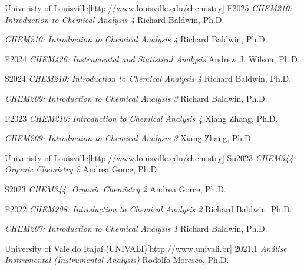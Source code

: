 \documentclass[10pt, twoside, table]{article} %
\begin{document}
\begin{timeline}{Univeristy of Louisville}[http://www.louisville.edu/chemistry]
    \entry
        {F2025}
        {\textit{CHEM210: Introduction to Chemical Analysis 4}}
        {Richard Baldwin, Ph.D.}

    \entry
        {}
        {\textit{CHEM210: Introduction to Chemical Analysis 4}}
        {Richard Baldwin, Ph.D.}

    \entry
        {F2024}
        {\textit{CHEM426: Instrumental and Statistical Analysis}}
        {Andrew J. Wilson, Ph.D.}

    \entry
        {S2024}
        {\textit{CHEM210: Introduction to Chemical Analysis 4}}
        {Richard Baldwin, Ph.D.}

    \entry
        {}
        {\textit{CHEM209: Introduction to Chemical Analysis 3}}
        {Richard Baldwin, Ph.D.}

    \entry
        {F2023}
        {\textit{CHEM210: Introduction to Chemical Analysis 4}}
        {Xiang Zhang, Ph.D.}

    \entry
        {}
        {\textit{CHEM209: Introduction to Chemical Analysis 3}}
        {Xiang Zhang, Ph.D.}
\end{timeline}

\vspace{\baselineskip}

\begin{timeline}{Univeristy of Louisville}[http://www.louisville.edu/chemistry]
    \entry
        {Su2023}
        {\textit{CHEM344: Organic Chemistry 2}}
        {Andrea Gorce, Ph.D.}

    \entry
        {S2023}
        {\textit{CHEM344: Organic Chemistry 2}}
        {Andrea Gorce, Ph.D.}

    \entry
        {F2022}
        {\textit{CHEM208: Introduction to Chemical Analysis 2}}
        {Richard Baldwin, Ph.D.}

    \entry
        {}
        {\textit{CHEM207: Introduction to Chemical Analysis 1}}
        {Richard Baldwin, Ph.D.}
\end{timeline}

\vspace{\baselineskip}

\begin{timeline}{University of Vale do Itajaí (UNIVALI)}[http://www.univali.br]
    \entry
        {2021.1}
        {\textit{Análise Instrumental (Instrumental Analysis)}}
        {Rodolfo Moresco, Ph.D.}
\end{timeline}
\end{document}

